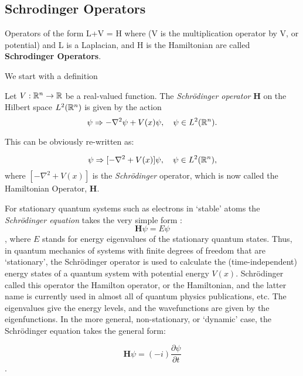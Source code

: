 \subsection{Schrodinger Operators}
\begin{rem}
 Operators of the form L+V = H where (V is the multiplication operator by V, or potential) and L is a Laplacian, and H
is the Hamiltonian are called \textbf{Schrodinger Operators}.
\end{rem}
We start with a definition
\begin{dfn}
Let $V: \mathbb{R}^n \to \mathbb{R}$ be a real-valued function.
The \emph{Schr\"odinger operator} \textbf{H} on the Hilbert space $L^2(\mathbb{R}^n)$ is given by the action
\[
\psi \Rightarrow -\nabla^2\psi+V(x)\psi, \quad\psi\in L^2(\mathbb{R}^n).
\]

This can be obviously re-written as:

\[
\psi \Rightarrow [-\nabla^2 +V(x)]\psi, \quad\psi\in L^2(\mathbb{R}^n),
\] where $[-\nabla^2 +V(x)]$ is the {\em Schr\"odinger} operator, which is now
called the Hamiltonian Operator, \textbf{H}.
\end{dfn}
For stationary quantum systems such as electrons in `stable' atoms the {\em Schr\"odinger equation}
takes the very simple form :
\[
\textbf{H} \psi=E \psi
\] , where $E$ stands for energy eigenvalues of the stationary quantum states. Thus, in quantum mechanics of systems with finite degrees of freedom that are `stationary', the Schr\"odinger operator is used to calculate the (time-independent) energy states of a quantum system with potential energy $V(x)$. 
Schr\"odinger called this operator the Hamilton operator, or the
Hamiltonian, and the latter name is currently used in almost all of quantum physics publications, etc. 
The eigenvalues give the energy levels, and the wavefunctions are given by the eigenfunctions.
In the more general, non-stationary, or `dynamic' case, the Schr\"odinger equation takes the general form:

\[
\textbf{H} \psi= (-i) \frac{\partial \psi}{\partial t}
\]. 